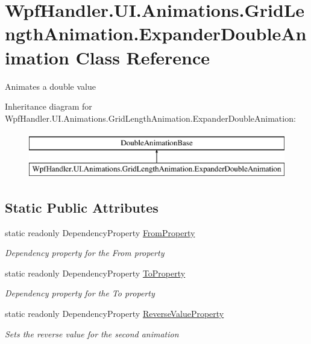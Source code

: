 \hypertarget{class_wpf_handler_1_1_u_i_1_1_animations_1_1_grid_length_animation_1_1_expander_double_animation}{}\section{Wpf\+Handler.\+U\+I.\+Animations.\+Grid\+Length\+Animation.\+Expander\+Double\+Animation Class Reference}
\label{class_wpf_handler_1_1_u_i_1_1_animations_1_1_grid_length_animation_1_1_expander_double_animation}


Animates a double value  


Inheritance diagram for Wpf\+Handler.\+U\+I.\+Animations.\+Grid\+Length\+Animation.\+Expander\+Double\+Animation\+:\begin{figure}[H]
\begin{center}
\leavevmode
\includegraphics[height=2.000000cm]{d8/d40/class_wpf_handler_1_1_u_i_1_1_animations_1_1_grid_length_animation_1_1_expander_double_animation}
\end{center}
\end{figure}
\subsection*{Static Public Attributes}
\begin{DoxyCompactItemize}
\item 
static readonly Dependency\+Property \mbox{\hyperlink{class_wpf_handler_1_1_u_i_1_1_animations_1_1_grid_length_animation_1_1_expander_double_animation_a07d113740c7fc7eb161b5a0e38148462}{From\+Property}}
\begin{DoxyCompactList}\small\item\em Dependency property for the From property \end{DoxyCompactList}\item 
static readonly Dependency\+Property \mbox{\hyperlink{class_wpf_handler_1_1_u_i_1_1_animations_1_1_grid_length_animation_1_1_expander_double_animation_ae633ca54f3b0259e8a469f95a3a2f14b}{To\+Property}}
\begin{DoxyCompactList}\small\item\em Dependency property for the To property \end{DoxyCompactList}\item 
static readonly Dependency\+Property \mbox{\hyperlink{class_wpf_handler_1_1_u_i_1_1_animations_1_1_grid_length_animation_1_1_expander_double_animation_a31911e20e670e43ed1fc9b112f28ef68}{Reverse\+Value\+Property}}
\begin{DoxyCompactList}\small\item\em Sets the reverse value for the second animation \end{DoxyCompactList}\end{DoxyCompactItemize}

